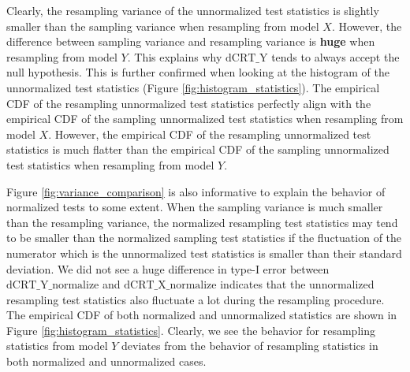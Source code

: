 \documentclass{article}
\begin{document}
Clearly, the resampling variance of the unnormalized test statistics is slightly smaller than the sampling variance when resampling 
from model $X$. However, the difference between sampling variance and resampling variance is \textbf{huge} when resampling from model $Y$.
This explains why $\mathrm{dCRT}\_\text{Y}$ tends to always accept the null hypothesis. This is further confirmed when looking at the 
histogram of the unnormalized test statistics (Figure \ref{fig:histogram_statistics}). The empirical CDF of the resampling unnormalized test 
statistics perfectly align with the empirical CDF of the sampling unnormalized test statistics when resampling from model $X$. However, the empirical 
CDF of the resampling unnormalized test statistics is much flatter than the empirical CDF of the sampling unnormalized test statistics when resampling
from model $Y$.

Figure \ref{fig:variance_comparison} is also informative to explain the behavior of normalized tests to some extent. When the sampling variance is much 
smaller than the resampling variance, the normalized resampling test statistics may tend to be smaller than the normalized sampling test statistics if 
the fluctuation of the numerator which is the unnormalized test statistics is smaller than their standard deviation. We did not see a huge difference 
in type-I error between $\mathrm{dCRT}\_\text{Y}\_\text{normalize}$ and $\mathrm{dCRT}\_\text{X}\_\text{normalize}$ indicates that the unnormalized resampling
test statistics also fluctuate a lot during the resampling procedure. The empirical CDF of both normalized and unnormalized statistics are shown in Figure 
\ref{fig:histogram_statistics}. Clearly, we see the behavior for resampling statistics from model $Y$ deviates from the behavior of resampling statistics 
in both normalized and unnormalized cases. 
\end{document}
